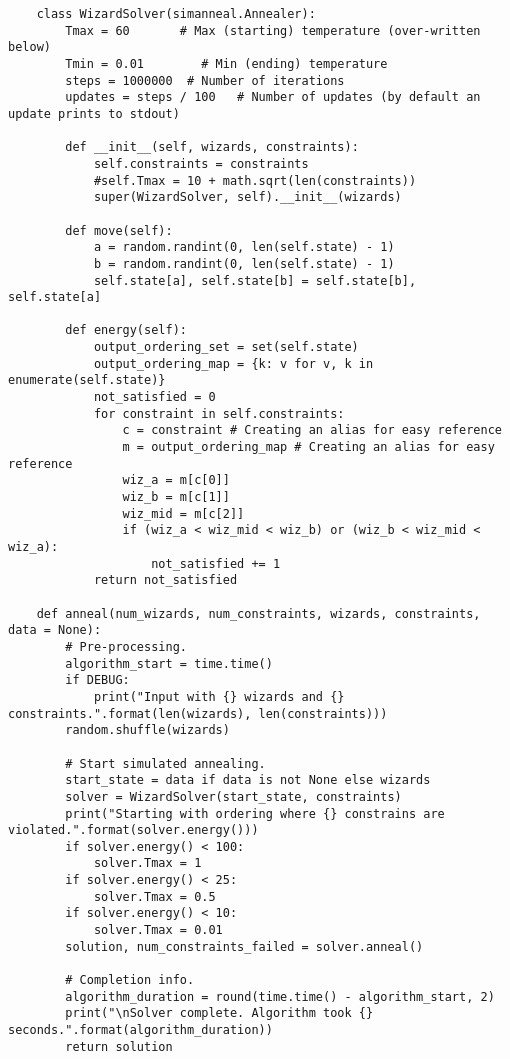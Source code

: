 \documentclass{article}
\theoremstyle{plain}
\numberwithin{theorem}{subsection}
\theoremstyle{definition}
\numberwithin{equation}{subsection}
\begin{document}
\begin{lstlisting}
    class WizardSolver(simanneal.Annealer):
        Tmax = 60       # Max (starting) temperature (over-written below)
        Tmin = 0.01        # Min (ending) temperature
        steps = 1000000  # Number of iterations
        updates = steps / 100   # Number of updates (by default an update prints to stdout)
    
        def __init__(self, wizards, constraints):
            self.constraints = constraints
            #self.Tmax = 10 + math.sqrt(len(constraints))
            super(WizardSolver, self).__init__(wizards) 
    
        def move(self):
            a = random.randint(0, len(self.state) - 1)
            b = random.randint(0, len(self.state) - 1)
            self.state[a], self.state[b] = self.state[b], self.state[a]
        
        def energy(self):
            output_ordering_set = set(self.state)
            output_ordering_map = {k: v for v, k in enumerate(self.state)}
            not_satisfied = 0
            for constraint in self.constraints:
                c = constraint # Creating an alias for easy reference
                m = output_ordering_map # Creating an alias for easy reference
                wiz_a = m[c[0]]
                wiz_b = m[c[1]]
                wiz_mid = m[c[2]]
                if (wiz_a < wiz_mid < wiz_b) or (wiz_b < wiz_mid < wiz_a):
                    not_satisfied += 1
            return not_satisfied
    
    def anneal(num_wizards, num_constraints, wizards, constraints, data = None):
        # Pre-processing.
        algorithm_start = time.time()
        if DEBUG:
            print("Input with {} wizards and {} constraints.".format(len(wizards), len(constraints)))
        random.shuffle(wizards)
    
        # Start simulated annealing.
        start_state = data if data is not None else wizards
        solver = WizardSolver(start_state, constraints)
        print("Starting with ordering where {} constrains are violated.".format(solver.energy()))
        if solver.energy() < 100:
            solver.Tmax = 1
        if solver.energy() < 25:
            solver.Tmax = 0.5
        if solver.energy() < 10:
            solver.Tmax = 0.01
        solution, num_constraints_failed = solver.anneal()
        
        # Completion info.
        algorithm_duration = round(time.time() - algorithm_start, 2)
        print("\nSolver complete. Algorithm took {} seconds.".format(algorithm_duration))
        return solution
    

\end{lstlisting}
\end{document}
